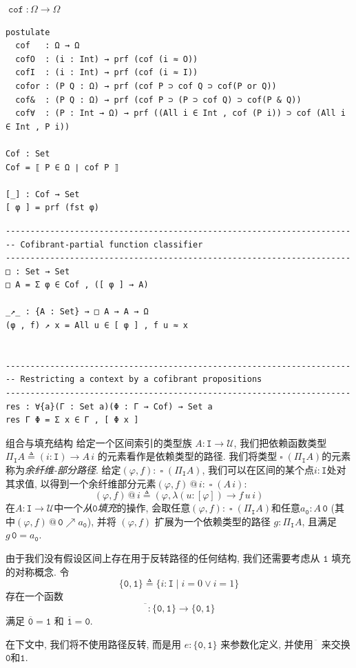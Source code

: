 \documentclass[aspectratio=169,xcolor=dvipsnames]{beamer}
\newcommand\calU{\mathcal{U}}
\newcommand\ttI{\mathtt{I}}
\newcommand\ttzero{\mathtt{0}}
\newcommand\ttone{\mathtt{1}}
\DeclareMathOperator\cof{\mathtt{cof}}
\DeclareMathOperator\cofibpart{\square}
\begin{document}
\begin{frame}[fragile]{$\cof:\Omega\to\Omega$}
  \begin{verbatim}
postulate
  cof   : Ω → Ω
  cofO  : (i : Int) → prf (cof (i ≈ O))
  cofI  : (i : Int) → prf (cof (i ≈ I))
  cofor : (P Q : Ω) → prf (cof P ⊃ cof Q ⊃ cof(P or Q))
  cof&  : (P Q : Ω) → prf (cof P ⊃ (P ⊃ cof Q) ⊃ cof(P & Q))
  cof∀  : (P : Int → Ω) → prf ((All i ∈ Int , cof (P i)) ⊃ cof (All i ∈ Int , P i))

Cof : Set
Cof = ⟦ P ∈ Ω ∣ cof P ⟧

[_] : Cof → Set
[ φ ] = prf (fst φ)

  \end{verbatim}
\end{frame}

\begin{frame}[fragile]{}
\begin{verbatim}
----------------------------------------------------------------------
-- Cofibrant-partial function classifier
----------------------------------------------------------------------
□ : Set → Set
□ A = Σ φ ∈ Cof , ([ φ ] → A)

_↗_ : {A : Set} → □ A → A → Ω
(φ , f) ↗ x = All u ∈ [ φ ] , f u ≈ x


----------------------------------------------------------------------
-- Restricting a context by a cofibrant propositions
----------------------------------------------------------------------
res : ∀{a}(Γ : Set a)(Φ : Γ → Cof) → Set a
res Γ Φ = Σ x ∈ Γ , [ Φ x ]

\end{verbatim}
\end{frame}

\begin{frame}{组合与填充结构}
  给定一个区间索引的类型族 $A : \ttI\to\calU$, 我们把依赖函数类型 $\Pi_{\ttI}A\triangleq(i:\ttI)\to A\,i$ 的元素看作是依赖类型的路径. 我们将类型$\cofibpart(\Pi_{\ttI}A)$的元素称为\emph{余纤维-部分路径}. 给定$(\varphi,f) : \cofibpart(\Pi_{\ttI}A)$, 我们可以在区间的某个点$i:\ttI$处对其求值, 以得到一个余纤维部分元素$(\varphi,f)\,@\,i : \cofibpart(A\,i)$:
  \[
  (\varphi,f)\,@\,i \triangleq (\varphi,\lambda(u:[\varphi])\to f\,u\,i)
  \]
  在$A : \ttI\to\calU$中一个\emph{从$\mathtt{0}$填充}的操作, 会取任意$(\varphi,f):\cofibpart(\Pi_{\ttI}A)$和任意$a_{\mathtt{0}}:A\,\mathtt{0}$ (其中$(\varphi,f)\,@\,\mathtt{0} \nearrow a_{\mathtt{0}}$), 并将 $(\varphi,f)$ 扩展为一个依赖类型的路径 $g:\Pi_{\ttI}A$, 且满足$g\,\mathtt{0} = a_{\mathtt{0}}$.

  由于我们没有假设区间上存在用于反转路径的任何结构, 我们还需要考虑从 $\ttone$ 填充的对称概念. 令
  \[
  \{\ttzero,\ttone\}\triangleq\{i:\ttI\mid i=0\lor i=1\}
  \]
  存在一个函数
  \[
  \overline{\phantom{\ttzero}} : \{ \ttzero, \ttone \} \to \{ \ttzero, \ttone \}
  \]
  满足 $\overline{\ttzero} = \ttone$ 和 $\overline{\ttone} = \ttzero$.

  在下文中, 我们将不使用路径反转, 而是用 $e:\{\ttzero,\ttone\}$ 来参数化定义, 并使用$\overline{\phantom{\ttzero}}$ 来交换$\ttzero$和$\ttone$.
\end{frame}
\end{document}
